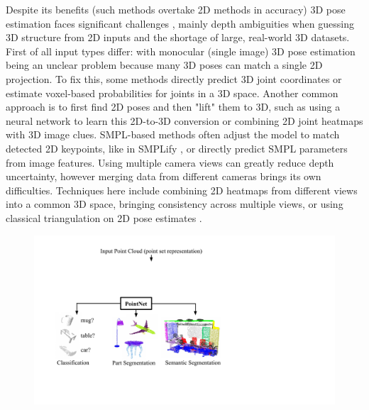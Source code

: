 \documentclass[12pt, a4paper]{article}
\begin{document}
Despite its benefits (such methods overtake 2D methods in accuracy) 3D pose estimation faces significant challenges \cite{3D-pose-estimation-review}, mainly depth ambiguities when guessing 3D structure from 2D inputs and the shortage of large, real-world 3D datasets. First of all input types differ: with monocular (single image) 3D pose estimation being an unclear problem because many 3D poses can match a single 2D projection. To fix this, some methods directly predict 3D joint coordinates or estimate voxel-based probabilities for joints in a 3D space. Another common approach is to first find 2D poses and then "lift" them to 3D, such as using a neural network to learn this 2D-to-3D conversion or combining 2D joint heatmaps with 3D image clues. SMPL-based methods often adjust the model to match detected 2D keypoints, like in SMPLify \cite{SMPLify}, or directly predict SMPL parameters from image features. Using multiple camera views can greatly reduce depth uncertainty, however merging data from different cameras brings its own difficulties. Techniques here include combining 2D heatmaps from different views into a common 3D space, bringing consistency across multiple views, or using classical triangulation on 2D pose estimates \cite{3D-pose-estimation-review}. 


 \begin{figure}[h]
    \centering
    \includegraphics[width=0.8\linewidth]{pictures/point-net.pdf}
    \label{fig:PointNet}
\end{figure}
\end{document}
